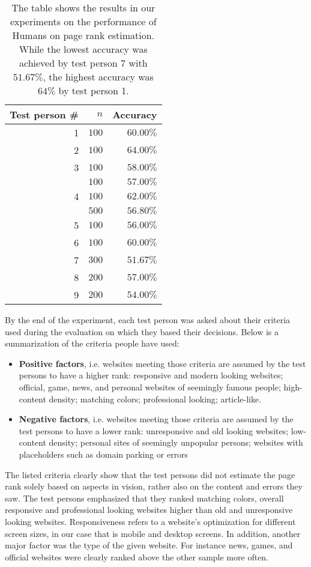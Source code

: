 \begin{table}[]
	\center
	\begin{tabular}{r|r|r}
		\textbf{Test person} \# & $n$ & \textbf{Accuracy} \\ \hline \hline
		1 & $100$ & $60.00\%$ \\ \hline
		2 & $100$ & $64.00\%$\\ \hline
		3 & $100$ & $58.00\%$\\ \hline
          & $100$ & $57.00\%$\\
        4 & $100$ & $62.00\%$\\
          & $500$ & $56.80\%$\\ \hline
		5 & $100$ & $56.00\%$\\ \hline
		6 & $100$ & $60.00\%$\\ \hline
		7 & $300$ & $51.67\%$\\ \hline
		8 & $200$ & $57.00\%$\\ \hline
		9 & $200$ & $54.00\%$\\
	\end{tabular}
	\caption[Results of Human Performance on Page Rank Estimation]{The table shows the results in our experiments on the performance of Humans on page rank estimation. While the lowest accuracy was achieved by test person 7 with $51.67\%$, the highest accuracy was $64\%$ by test person 1.}
\label{table_human_eval_results}
\end{table}

By the end of the experiment, each test person was asked about their criteria used during the evaluation on which they based their decisions. Below is a summarization of the criteria people have used:

\begin{itemize}
	\item \textbf{Positive factors}, i.e. websites meeting those criteria are assumed by the test persons to have a higher rank: responsive and modern looking websites; official, game, news, and personal websites of seemingly famous people; high-content density; matching colors; professional looking; article-like.
	\item \textbf{Negative factors}, i.e. websites meeting those criteria are assumed by the test persons to have a lower rank: unresponsive and old looking websites; low-content density; personal sites of seemingly unpopular persons; websites with placeholders such as domain parking or errors
\end{itemize}

The listed criteria clearly show that the test persons did not estimate the page rank solely based on aspects in vision, rather also on the content and errors they saw. The test persons emphasized that they ranked matching colors, overall responsive and professional looking websites higher than old and unresponsive looking websites. Responsiveness refers to a website's optimization for different screen sizes, in our case that is mobile and desktop screens. In addition, another major factor was the type of the given website. For instance news, games, and official websites were clearly ranked above the other sample more often.

